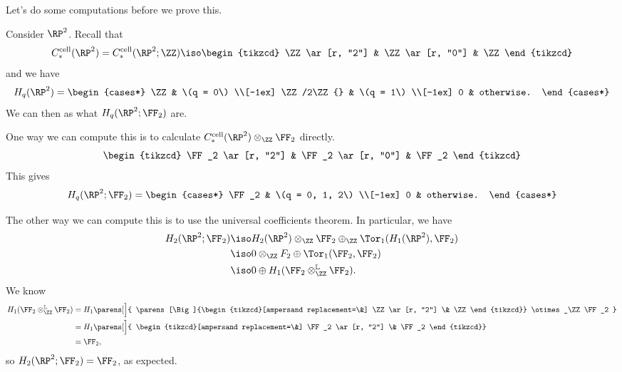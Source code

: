 \documentclass{standalone}
\begin{document}
Let's do some computations before we prove this.
\begin{example}
  Consider \(\RP^2\).
  Recall that
  \[
    \Ccell_*(\RP^2) = \Ccell_*(\RP^2; \ZZ) \iso \begin{tikzcd}
        \ZZ \ar[r, "2"] & \ZZ \ar[r, "0"] & \ZZ
    \end{tikzcd}
  \]
  and we have
  \[
    H_q(\RP^2) = \begin{cases*}
      \ZZ & \(q = 0\) \\[-1ex]
      \ZZ/2\ZZ{} & \(q = 1\) \\[-1ex]
      0 & otherwise.
    \end{cases*}
  \]
  We can then as what \(H_q(\RP^2; \FF_2)\) are.

  One way we can compute this is to calculate
  \(\Ccell_*(\RP^2) \otimes_\ZZ \FF_2\) directly.
  \[
    \begin{tikzcd}
      \FF_2 \ar[r, "2"] & \FF_2 \ar[r, "0"] & \FF_2
    \end{tikzcd}
  \]
  This gives
  \[
    H_q(\RP^2; \FF_2) = \begin{cases*}
      \FF_2 & \(q = 0, 1, 2\) \\[-1ex]
      0 & otherwise.
    \end{cases*}
  \]
  
  The other way we can compute this is to use
  the universal coefficients theorem.
  In particular, we have
  \begin{align*}
    H_2(\RP^2; \FF_2) &\iso H_2(\RP^2) \otimes_\ZZ \FF_2
                          \oplus_\ZZ \Tor_1(H_1(\RP^2), \FF_2) \\
      &\iso 0 \otimes_\ZZ F_2 \oplus \Tor_1(\FF_2, \FF_2) \\
      &\iso 0 \oplus H_1(\FF_2 \otimes^{\mathbb L}_\ZZ \FF_2).
  \end{align*}
  We know
  \begin{align*}
    H_1(\FF_2 \otimes^{\mathbb L}_\ZZ \FF_2)
      &= H_1\parens[\Big]{
        \parens[\Big]{\begin{tikzcd}[ampersand replacement=\&]
          \ZZ \ar[r, "2"] \& \ZZ
        \end{tikzcd}}
        \otimes_\ZZ \FF_2
      } \\
      &= H_1\parens[\Big]{
        \begin{tikzcd}[ampersand replacement=\&]
          \FF_2 \ar[r, "2"] \& \FF_2
        \end{tikzcd}} \\
      &= \FF_2,
  \end{align*}
  so \(H_2(\RP^2; \FF_2) = \FF_2\), as expected.


\end{example}
\end{document}
